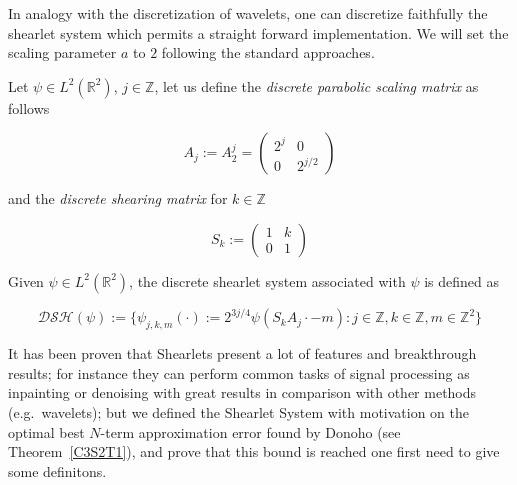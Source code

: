 In analogy with the discretization of wavelets, one can discretize faithfully the shearlet system which permits a straight forward implementation. We will set the scaling parameter $a$ to $2$ following the standard approaches.

\begin{defn}
Let $\psi\in L^2(\mathbb{R}^2)$, $j\in\mathbb{Z}$, let us define the \textit{discrete parabolic scaling matrix} as follows

\begin{equation}
\label{eq:discscaling}
A_j:= A_2^j =
\left(\begin{matrix}
2^j & 0 \\
0 & 2^{j/2}
\end{matrix}\right)
\end{equation}

and the \textit{discrete shearing matrix} for $k\in\mathbb{Z}$

\begin{equation}
\label{eq:discshearing}
S_k:= 
\left(\begin{matrix}
1 & k \\
0 & 1
\end{matrix}\right) 
\end{equation}

Given $\psi\in L^2(\mathbb{R}^2)$, the discrete shearlet system associated with $\psi$ is defined as

\begin{equation}
\label{eq:discshearletsys}
\mathcal{DSH}(\psi):=\{\psi_{j,k,m}(\cdot):=2^{3j/4}\psi (S_kA_j\cdot-m):j\in\mathbb{Z},k\in\mathbb{Z},m\in\mathbb{Z}^2\}
\end{equation}
\end{defn}

It has been proven that Shearlets present a lot of features and breakthrough results; for instance they can perform common tasks of signal processing as inpainting or denoising with great results in comparison with other methods (e.g.\ wavelets); but we defined the Shearlet System with motivation on the optimal best $N$-term approximation error found by Donoho (see Theorem~\ref{C3S2T1}), and prove that this bound is reached one first need to give some definitons.

